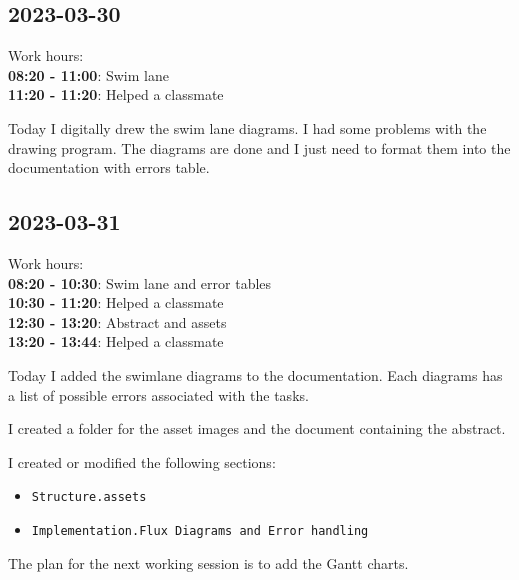 \documentclass{article}
\begin{document}
\subsection{2023-03-30}

Work hours:\\
\textbf{08:20 - 11:00}: Swim lane \\
\textbf{11:20 - 11:20}: Helped a classmate

Today I digitally drew the swim lane diagrams.
I had some problems with the drawing program.
The diagrams are done and I just need to format them
into the documentation with errors table.

\subsection{2023-03-31}

Work hours:\\
\textbf{08:20 - 10:30}: Swim lane and error tables \\
\textbf{10:30 - 11:20}: Helped a classmate \\
\textbf{12:30 - 13:20}: Abstract and assets \\
\textbf{13:20 - 13:44}: Helped a classmate 

Today I added the swimlane diagrams to the documentation.
Each diagrams has a list of possible errors associated
with the tasks.

I created a folder for the asset images and the
document containing the abstract.

I created or modified the following sections:
\begin{itemize}
    \item \texttt{Structure.assets}
    \item \texttt{Implementation.Flux Diagrams and Error handling}
\end{itemize}

The plan for the next working session is to add
the Gantt charts.
\end{document}
